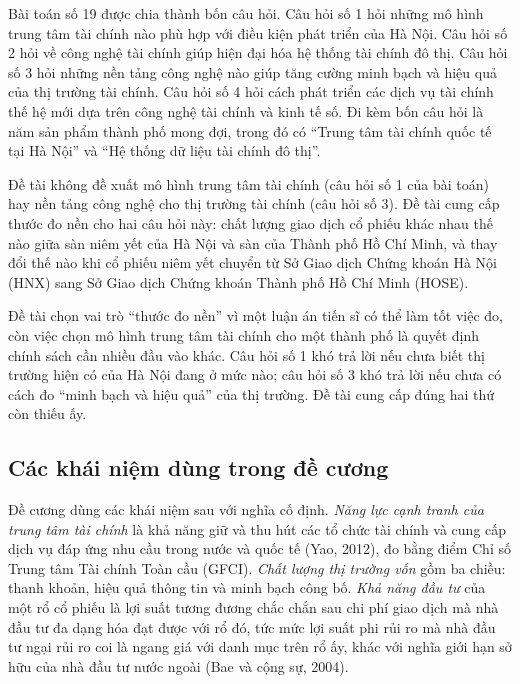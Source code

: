 Bài toán số 19 được chia thành bốn câu hỏi. Câu hỏi số 1 hỏi những mô hình trung tâm tài chính nào phù hợp với điều kiện phát triển của Hà Nội. Câu hỏi số 2 hỏi về công nghệ tài chính giúp hiện đại hóa hệ thống tài chính đô thị. Câu hỏi số 3 hỏi những nền tảng công nghệ nào giúp tăng cường minh bạch và hiệu quả của thị trường tài chính. Câu hỏi số 4 hỏi cách phát triển các dịch vụ tài chính thế hệ mới dựa trên công nghệ tài chính và kinh tế số. Đi kèm bốn câu hỏi là năm sản phẩm thành phố mong đợi, trong đó có \enquote{Trung tâm tài chính quốc tế tại Hà Nội} và \enquote{Hệ thống dữ liệu tài chính đô thị}.

Đề tài không đề xuất mô hình trung tâm tài chính (câu hỏi số 1 của bài toán) hay nền tảng công nghệ cho thị trường tài chính (câu hỏi số 3). Đề tài cung cấp thước đo nền cho hai câu hỏi này: chất lượng giao dịch cổ phiếu khác nhau thế nào giữa sàn niêm yết của Hà Nội và sàn của Thành phố Hồ Chí Minh, và thay đổi thế nào khi cổ phiếu niêm yết chuyển từ Sở Giao dịch Chứng khoán Hà Nội (HNX) sang Sở Giao dịch Chứng khoán Thành phố Hồ Chí Minh (HOSE).

Đề tài chọn vai trò \enquote{thước đo nền} vì một luận án tiến sĩ có thể làm tốt việc đo, còn việc chọn mô hình trung tâm tài chính cho một thành phố là quyết định chính sách cần nhiều đầu vào khác. Câu hỏi số 1 khó trả lời nếu chưa biết thị trường hiện có của Hà Nội đang ở mức nào; câu hỏi số 3 khó trả lời nếu chưa có cách đo \enquote{minh bạch và hiệu quả} của thị trường. Đề tài cung cấp đúng hai thứ còn thiếu ấy.

\subsection*{Các khái niệm dùng trong đề cương}

Đề cương dùng các khái niệm sau với nghĩa cố định. \emph{Năng lực cạnh tranh của trung tâm tài chính} là khả năng giữ và thu hút các tổ chức tài chính và cung cấp dịch vụ đáp ứng nhu cầu trong nước và quốc tế (Yao, 2012), đo bằng điểm Chỉ số Trung tâm Tài chính Toàn cầu (GFCI). \emph{Chất lượng thị trường vốn} gồm ba chiều: thanh khoản, hiệu quả thông tin và minh bạch công bố. \emph{Khả năng đầu tư} của một rổ cổ phiếu là lợi suất tương đương chắc chắn sau chi phí giao dịch mà nhà đầu tư đa dạng hóa đạt được với rổ đó, tức mức lợi suất phi rủi ro mà nhà đầu tư ngại rủi ro coi là ngang giá với danh mục trên rổ ấy, khác với nghĩa giới hạn sở hữu của nhà đầu tư nước ngoài (Bae và cộng sự, 2004).

